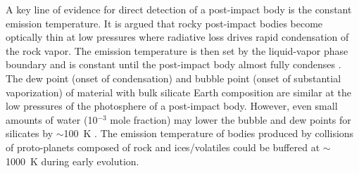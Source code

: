 \documentclass[sn-nature]{sn-jnl}%
\begin{document}

A key line of evidence for direct detection of a post-impact body is the constant emission temperature.
%
It is argued \cite{Lock18} that rocky post-impact bodies become optically thin at low pressures where radiative loss drives rapid condensation of the rock vapor.
%
The emission temperature is then set by the liquid-vapor phase boundary and is constant until the post-impact body almost fully condenses \cite{Lock18,Caracas2023}.
%
The dew point (onset of condensation) and bubble point (onset of substantial vaporization) of material with bulk silicate Earth composition are similar \cite[$\sim2300$~K, within $\sim 100$~K;][]{Lock18,Fegley2023_BSE_cond} at the low pressures of the photosphere of a post-impact body.
%
%
%
However, even small amounts of water (10$^{-3}$ mole fraction) may lower the bubble and dew points for silicates by $\sim$100~K \cite[][]{Fegley2023_BSE_cond,Lock18}. 
%
The emission temperature of bodies produced by collisions of proto-planets composed of rock and ices/volatiles could be buffered at $\sim$1000~K during early evolution.


\end{document}
